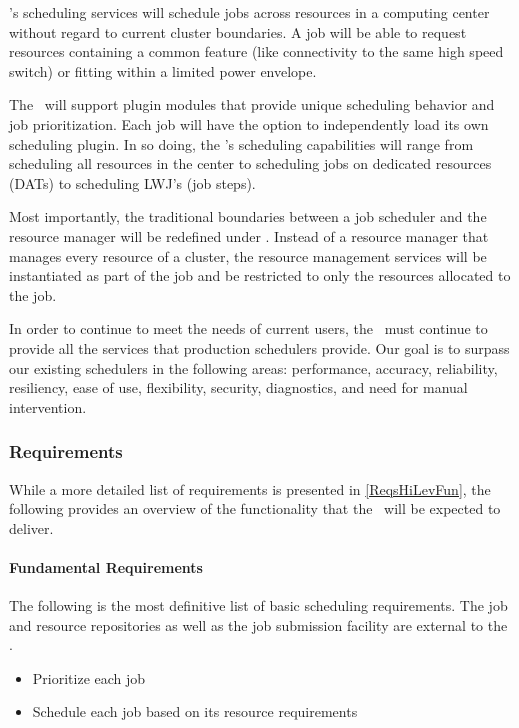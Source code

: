 \ngjs's scheduling services will schedule jobs across resources in a
computing center without regard to current cluster boundaries.  A job
will be able to request resources containing a common feature (like
connectivity to the same high speed switch) or fitting within a
limited power envelope.

The \ngjs\ will support plugin modules that provide unique scheduling
behavior and job prioritization.  Each job will have the option to
independently load its own scheduling plugin.  In so doing, the
\ngjs's scheduling capabilities will range from scheduling all
resources in the center to scheduling jobs on dedicated resources
(DATs) to scheduling LWJ's (job steps).

Most importantly, the traditional boundaries between a job scheduler
and the resource manager will be redefined under \ngrm.  Instead of a
resource manager that manages every resource of a cluster, the
resource management services will be instantiated as part of the job
and be restricted to only the resources allocated to the job.

In order to continue to meet the needs of current users, the
\ngjs\ must continue to provide all the services that production
schedulers provide.  Our goal is to surpass our existing schedulers in
the following areas: performance, accuracy, reliability, resiliency,
ease of use, flexibility, security, diagnostics, and need for manual
intervention.

\subsubsection{Requirements}

While a more detailed list of requirements is presented in
\ref{ReqsHiLevFun}, the following provides an overview of the
functionality that the \ngjs\ will be expected to deliver.

\paragraph{Fundamental Requirements}

The following is the most definitive list of basic scheduling
requirements.  The job and resource repositories as well as the job
submission facility are external to the \ngjs.

\begin{itemize}
  \item Prioritize each job
  \item Schedule each job based on its resource requirements
\end{itemize}

